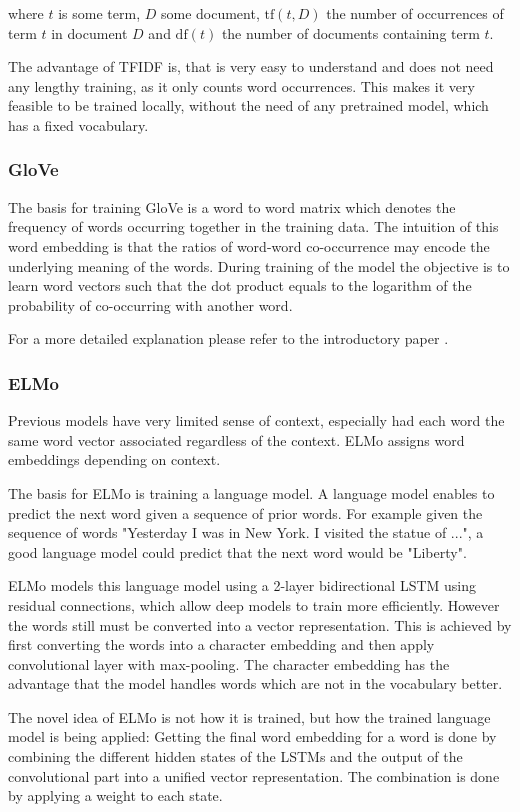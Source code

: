 \documentclass[draft,final,oneside]{vutinfth} %
\begin{document}
where $t$ is some term, $D$ some document, $\text{tf}(t, D)$ the number of occurrences of term $t$ in document $D$ and $\text{df}(t)$ the number of documents containing term $t$.

The advantage of TFIDF is, that is very easy to understand and does not need any lengthy training, as it only counts word occurrences. This makes it very feasible to be trained locally, without the need of any pretrained model, which has a fixed vocabulary.

\subsubsection{GloVe \cite{glovepage}}
The basis for training GloVe is a word to word matrix which denotes the frequency of words occurring together in the training data. The intuition of this word embedding is that the ratios of word-word co-occurrence may encode the underlying meaning of the words. During training of the model the objective is to learn word vectors such that the dot product equals to the logarithm of the probability of co-occurring with another word.

For a more detailed explanation please refer to the introductory paper \cite{glovepage}.

\subsubsection{ELMo \cite{elmo}}
Previous models have very limited sense of context, especially had each word the same word vector associated regardless of the context. ELMo assigns word embeddings depending on context.

The basis for ELMo is training a language model. A language model enables to predict the next word given a sequence of prior words. For example given the sequence of words "Yesterday I was in New York. I visited the statue of ...", a good language model could predict that the next word would be "Liberty".

ELMo models this language model using a 2-layer bidirectional LSTM using residual connections, which allow deep models to train more efficiently. However the words still must be converted into a vector representation. This is achieved by first converting the words into a character embedding and then apply convolutional layer with max-pooling. The character embedding has the advantage that the model handles words which are not in the vocabulary better.

The novel idea of ELMo is not how it is trained, but how the trained language model is being applied: Getting the final word embedding for a word is done by combining the different hidden states of the LSTMs and the output of the convolutional part into a unified vector representation. The combination is done by applying a weight to each state.
\end{document}
